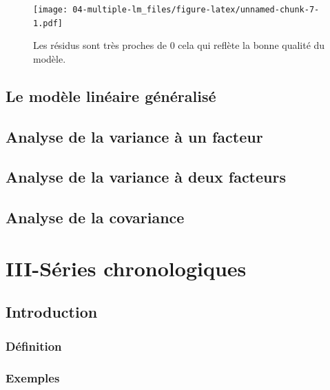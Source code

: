\documentclass[
]{book}
\begin{document}
\begin{figure}
\centering
\texttt{[image: 04-multiple-lm\_files/figure-latex/unnamed-chunk-7-1.pdf]}
\caption{\label{fig:unnamed-chunk-7}Les résidus sont très proches de 0 cela qui reflète la bonne qualité du modèle.}
\end{figure}

\hypertarget{glm}{%
\chapter{Le modèle linéaire généralisé}\label{glm}}

\hypertarget{anova1}{%
\chapter{Analyse de la variance à un facteur}\label{anova1}}

\hypertarget{anova2}{%
\chapter{Analyse de la variance à deux facteurs}\label{anova2}}

\hypertarget{ancova}{%
\chapter{Analyse de la covariance}\label{ancova}}

\hypertarget{part-iii-suxe9ries-chronologiques}{%
\part{III-Séries chronologiques}\label{part-iii-suxe9ries-chronologiques}}

\hypertarget{intro-ts}{%
\chapter{Introduction}\label{intro-ts}}

\hypertarget{duxe9finition-5}{%
\section{Définition}\label{duxe9finition-5}}

\hypertarget{exemples}{%
\section{Exemples}\label{exemples}}
\end{document}
